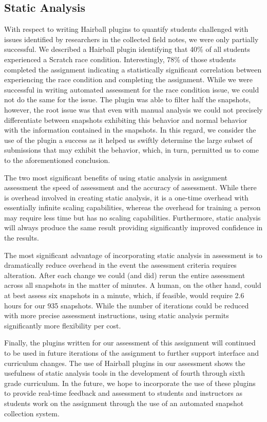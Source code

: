 \subsection{Static Analysis}
With respect to writing Hairball plugins to quantify students challenged with
issues identified by researchers in the collected field notes, we were only
partially successful. We described a Hairball plugin identifying that 40\% of
all students experienced a Scratch race condition. Interestingly, 78\% of those
students completed the assignment indicating a statistically significant
correlation between experiencing the race condition and completing the
assignment. While we were successful in writing automated assessment for the
race condition issue, we could not do the same for the \dce{} issue. The plugin
was able to filter half the snapshots, however, the root issue was that even
with manual analysis we could not precisely differentiate between snapshots
exhibiting this behavior and normal behavior with the information contained in
the snapshots. In this regard, we consider the use of the plugin a success as
it helped us swiftly determine the large subset of submissions that may exhibit
the behavior, which, in turn, permitted us to come to the aforementioned
conclusion.

The two most significant benefits of using static analysis in assignment
assessment the speed of assessment and the accuracy of assessment. While there
is overhead involved in creating static analysis, it is a one-time overhead
with essentially infinite scaling capabilities, whereas the overhead for
training a person may require less time but has no scaling
capabilities. Furthermore, static analysis will always produce the same result
providing significantly improved confidence in the results.

The most significant advantage of incorporating static analysis in
assessment is to dramatically reduce overhead in the event the assessment
criteria requires alteration. After each change we could (and did) rerun the
entire assessment across all snapshots in the matter of minutes. A human, on
the other hand, could at best assess six snapshots in a minute, which, if
feasible, would require 2.6 hours for our 935 snapshots. While the number of
iterations could be reduced with more precise assessment instructions, using
static analysis permits significantly more flexibility per cost.

Finally, the plugins written for our assessment of this assignment will
continued to be used in future iterations of the assignment to further support
interface and curriculum changes. The use of Hairball plugins in our assessment
shows the usefulness of static analysis tools in the development of fourth
through sixth grade curriculum. In the future, we hope to incorporate the use
of these plugins to provide real-time feedback and assessment to students and
instructors as students work on the assignment through the use of an automated
snapshot collection system.
